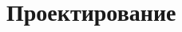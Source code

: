 \documentclass[../document.tex]{subfiles}
\begin{document}
    \section{Проектирование}
\end{document}
